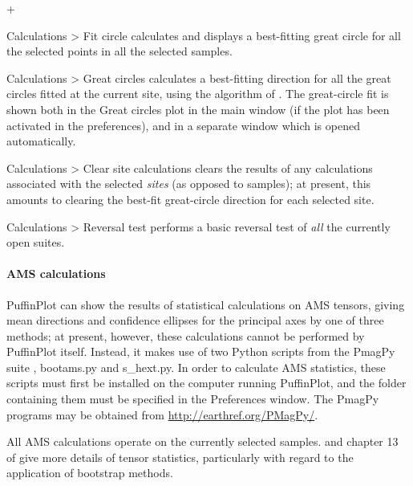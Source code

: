 \documentclass[a4paper,british]{article}
\newcommand{\menuitemlabel}[1]{%
\mbox{\textsf{#1}}\hfil}
\newenvironment{menuitemlist}%
{\begin{list}{}{%
\renewcommand{\makelabel}{\menuitemlabel}%
\setlength{\labelwidth}{35pt}%
\setlength{\leftmargin}%
             {\labelwidth+\labelsep}}}%
{\end{list}}
\newcommand{\ppcmd}[1]{\textsf{#1}} %
\newcommand{\caps}[1]{\MakeTextUppercase{#1}} %
\newcommand{\submenu}{ \textgreater{} } %
\begin{document}
\begin{menuitemlist}
\item[Calculations\submenu Fit circle] calculates and displays a
best-fitting great circle for all the selected points in all the selected
samples.

\item[Calculations\submenu Great circles] calculates a best-fitting
direction for all the great circles fitted at the current site,
using the algorithm of \cite{mcfadden1988circles}. The great-circle fit
is shown both in the \ppcmd{Great circles} plot in the main window
(if the plot has been activated in the preferences), and in
a separate window which is opened automatically.

\item[Calculations\submenu Clear site calculations] clears the
results of any calculations associated with the selected {\em sites}
(as opposed to samples); at present, this amounts to clearing the
best-fit great-circle direction for each selected site.

\item[Calculations\submenu Reversal test] performs a basic reversal
test of {\em all} the currently open suites.

\end{menuitemlist}

\paragraph{\caps{Ams} calculations}

PuffinPlot can show the results of statistical calculations on \caps{ams}
tensors, giving mean directions and confidence ellipses for the principal
axes by one of three methods; at present, however, these calculations cannot
be performed by PuffinPlot itself. Instead, it makes use of two Python
scripts from the PmagPy suite \citep{tauxe2010paleomagnetism},
\ppcmd{bootams.py} and \ppcmd{s\_hext.py}. In order to calculate \caps{ams}
statistics, these scripts must first be installed on the computer running
PuffinPlot, and the folder containing them must be specified in the
\ppcmd{Preferences} window. The PmagPy programs may be obtained from
\url{http://earthref.org/PMagPy/}.

All \caps{ams} calculations operate on the currently selected samples.
\cite{tauxe1998directions} and chapter 13 of \cite{tauxe2010paleomagnetism}
give more details of tensor statistics, particularly with regard to the
application of bootstrap methods.
\end{document}
